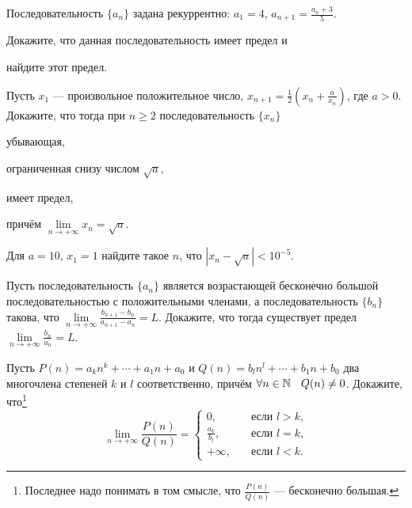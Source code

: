 \documentclass[a4paper, 12pt, num=31]{listok}
\begin{document}
\begin{problem}
    Последовательность $\{a_n\}$ задана рекуррентно: $a_1 = 4$, $a_{n + 1} = \frac{a_n + 3}5$.
    \begin{probparts}
        \item Докажите, что данная последовательность имеет предел и
        \item найдите этот предел.
    \end{probparts}
\end{problem}
\begin{problem}
    Пусть $x_1$ --- произвольное положительное число, $x_{n + 1} = \frac12 \left ( x_n + \frac a{x_n} \right )$, где $a > 0$.
    Докажите, что тогда при $n \ge 2$ последовательность $\{x_n\}$
    \begin{probparts}
        \item убывающая,
        \item ограниченная снизу числом $\sqrt a$,
        \item имеет предел,
        \item причём $\lim\limits_{n \to + \infty} x_n = \sqrt a$.
        \item Для $a = 10$, $x_1 = 1$ найдите такое $n$, что $|x_n - \sqrt a| < 10^{-5}$.
    \end{probparts}
\end{problem}
\begin{problem}
    Пусть последовательность $\{a_n\}$ является возрастающей бесконечно большой последовательностью с положительными членами,
    а последовательность $\{b_n\}$ такова, что $\lim\limits_{n\to+\infty}\frac{b_{n + 1} - b_n}{a_{n + 1} - a_n} = L$.
    Докажите, что тогда существует предел $\lim\limits_{n\to+\infty}\frac{b_n}{a_n} = L$.
\end{problem}
\begin{problem}
    Пусть $P(n) = a_k n^k + \cdots + a_1 n + a_0$ и $Q(n) = b_l n^l + \cdots + b_1 n + b_0$  два многочлена степеней $k$ и $l$ соответственно,
    причём $\forall{n \in \N} Q(n) \ne 0$.
    Докажите, что\footnote{Последнее надо понимать в том смысле, что $\frac{P (n)}{Q (n)}$ --- бесконечно большая.}
    \[
        \lim_{n \to + \infty} \frac{P(n)}{Q(n)} = \left \{
        \begin{aligned}
            0, & \quad\text{если $l > k$,} \\
            \frac{a_k}{b_l}, & \quad\text{если $l = k$,}\\
            +\infty, & \quad\text{если $l < k$.}
        \end{aligned}
        \right .
    \]
\end{problem}
\end{document}
